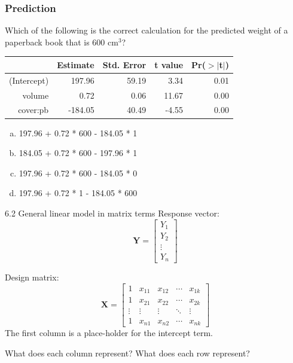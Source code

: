 \documentclass{beamer}
\begin{document}
\begin{frame}
\frametitle{Prediction}

Which of the following is the correct calculation for the predicted weight of a paperback book that is 600 cm$^3$?

{\small
\begin{center}
\begin{tabular}{rrrrr}
  \hline
 & Estimate & Std. Error & t value & Pr($>$$|$t$|$) \\ 
  \hline
(Intercept) & 197.96 & 59.19 & 3.34 & 0.01 \\ 
  volume & 0.72 & 0.06 & 11.67 & 0.00 \\ 
  cover:pb & -184.05 & 40.49 & -4.55 & 0.00 \\ 
   \hline
\end{tabular}
\end{center}
}

\begin{enumerate}[(a)]
\item 197.96 + 0.72 * 600 - 184.05 * 1 
\item 184.05 + 0.72 * 600 - 197.96 * 1
\item 197.96 + 0.72 * 600 - 184.05 * 0
\item 197.96 + 0.72 * 1 - 184.05 * 600
\end{enumerate}

\end{frame}



\begin{frame}{6.2 General linear model in matrix terms}
Response vector:
$$
\mathbf{Y}=\begin{bmatrix}
Y_1\\Y_2\\\vdots\\Y_n
\end{bmatrix}
$$

\pause Design matrix: 
$$
\mathbf{X}=\begin{bmatrix}
1 & x_{11} & x_{12} & \cdots & x_{1k}\\
1 & x_{21} & x_{22} & \cdots & x_{2k}\\
\vdots & \vdots & \vdots & \ddots & \vdots\\
1 & x_{n1} & x_{n2} & \cdots & x_{nk}
\end{bmatrix}
$$
The first column is a place-holder for the intercept term. 

\pause What does each column represent? \pause What does each row represent?
\end{frame}
\end{document}
